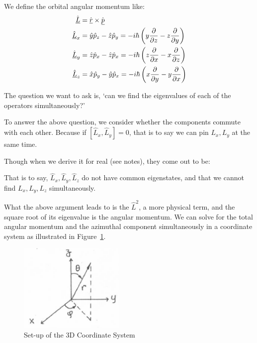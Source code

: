 \documentclass{school-22.101-notes}
\begin{document}
We define the orbital angular momentum like:
\begin{align}
\hat{\underline{L}} &= \hat{\underline{r}} \times \hat{\underline{p}} \\
\hat{\underline{L}}_x &= \hat{y} \hat{p}_z - \hat{z} \hat{p}_y = - i\hbar \left( y \frac{\partial}{\partial z} - z \frac{\partial}{\partial y} \right) \\
\hat{\underline{L}}_y &= \hat{z} \hat{p}_x - \hat{z} \hat{p}_x = - i\hbar \left( z \frac{\partial}{\partial x} - x \frac{\partial}{\partial z} \right) \\
\hat{\underline{L}}_z &= \hat{x} \hat{p}_y - \hat{y} \hat{p}_x = - i\hbar \left( x \frac{\partial}{\partial y} - y \frac{\partial}{\partial x} \right) 
\end{align}

The question we want to ask is, `can we find the eigenvalues of each of the operators simultaneously?'

To answer the above question, we consider whether the components commute with each other. Because if $\left[ \hat{L}_x, \hat{L}_y \right] = 0$, that is to say we can pin $L_x, L_y$ at the same time. 

Though when we derive it for real (see notes), they come out to be:

That is to say, $\hat{L}_x, \hat{L}_y, \hat{L}_z$ do not have common eigenstates, and that we cannot find $L_x, L_y, L_z$ simultaneously. 

What the above argument leads to is the $\hat{L}^2$,  a more physical term, and the square root of its eigenvalue is the angular momentum. 
We can solve for the total angular momentum and the azimuthal component simultaneously in a coordinate system as illustrated in Figure~\ref{3DCS}. 
\begin{figure}
    \centering
    \includegraphics[width=2in]{images/qm/3DCS.png}
    \caption{Set-up of the 3D Coordinate System\label{3DCS}}
\end{figure}
\end{document}

